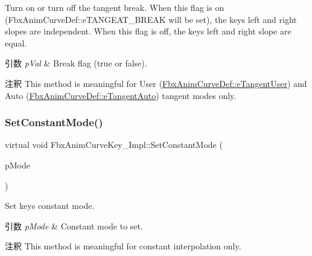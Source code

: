 Turn on or turn off the tangent break. When this flag is on (Fbx\+Anim\+Curve\+Def\+::e\+T\+A\+N\+G\+E\+A\+T\+\_\+\+B\+R\+E\+AK will be set), the key\textquotesingle{}s left and right slopes are independent. When this flag is off, the key\textquotesingle{}s left and right slope are equal. 
\begin{DoxyParams}{引数}
{\em p\+Val} & Break flag ({\ttfamily true} or {\ttfamily false}). \\
\hline
\end{DoxyParams}
\begin{DoxyRemark}{注釈}
This method is meaningful for User (\hyperlink{class_fbx_anim_curve_def_ac810ccc5ca0527704ab5175479964b87a199cb16b2c861b12c334093ce796cb86}{Fbx\+Anim\+Curve\+Def\+::e\+Tangent\+User}) and Auto (\hyperlink{class_fbx_anim_curve_def_ac810ccc5ca0527704ab5175479964b87a56e3bad364851277281e94e81327dd25}{Fbx\+Anim\+Curve\+Def\+::e\+Tangent\+Auto}) tangent modes only. 
\end{DoxyRemark}
\mbox{\label{class_fbx_anim_curve_key___impl_acdda5216487f7d9c0227a6d84bf9682c}} 
\subsubsection{\texorpdfstring{Set\+Constant\+Mode()}{SetConstantMode()}}
{\footnotesize\ttfamily virtual void Fbx\+Anim\+Curve\+Key\+\_\+\+Impl\+::\+Set\+Constant\+Mode (\begin{DoxyParamCaption}\item[{\hyperlink{class_fbx_anim_curve_def_a52885abd392ac8ac3da94bafc5fddd64}{Fbx\+Anim\+Curve\+Def\+::\+E\+Constant\+Mode}}]{p\+Mode }\end{DoxyParamCaption})\hspace{0.3cm}{\ttfamily [pure virtual]}}

Set key\textquotesingle{}s constant mode. 
\begin{DoxyParams}{引数}
{\em p\+Mode} & Constant mode to set. \\
\hline
\end{DoxyParams}
\begin{DoxyRemark}{注釈}
This method is meaningful for constant interpolation only. 
\end{DoxyRemark}
\mbox{\label{class_fbx_anim_curve_key___impl_ac4cbe2f9caddb5a80fa009349c3ef059}} 
